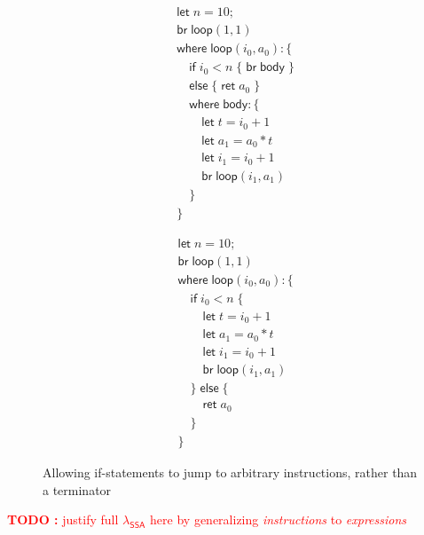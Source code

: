 \documentclass[acmsmall,screen,review]{acmart}
\newcounter{todos}
\newcommand{\TODO}[1]{{
  \stepcounter{todos}
  \begin{center}\large{\textcolor{red}{\textbf{TODO \arabic{todos}:} #1}}\end{center}
}}
\newcommand{\ms}[1]{\ensuremath{\mathsf{#1}}}
\newcommand{\isotopessa}{\(\lambda_{\ms{SSA}}\)}
\begin{document}
\begin{figure}
  \centering
  \begin{subfigure}[t]{.5\textwidth}
    \begin{align*}
      & \ms{let}\;n = 10; \\
      & \ms{br}\;\ms{loop}(1, 1) \\
      & \ms{where}\;\ms{loop}(i_0, a_0): \{ \\
      & \quad \ms{if}\;i_0 < n\;\{\;\ms{br}\;\ms{body}\;\} \\
      & \quad \ms{else}\;\{\;\ms{ret}\;a_0\;\} \\
      & \quad \ms{where}\;\ms{body}: \{\\ 
      & \qquad \ms{let}\;t = i_0 + 1 \\
      & \qquad \ms{let}\;a_1 = a_0 * t \\
      & \qquad \ms{let}\;i_1 = i_0 + 1 \\
      & \qquad \ms{br}\;\ms{loop}(i_1, a_1) \\
      & \quad \} \\
      & \}
    \end{align*}
  \end{subfigure}%
  \begin{subfigure}[t]{.5\textwidth}
    \begin{align*}
      & \ms{let}\;n = 10; \\
      & \ms{br}\;\ms{loop}(1, 1) \\
      & \ms{where}\;\ms{loop}(i_0, a_0): \{\\
      & \quad \ms{if}\;i_0 < n\;\{ \\
      & \qquad \ms{let}\;t = i_0 + 1 \\
      & \qquad \ms{let}\;a_1 = a_0 * t \\
      & \qquad \ms{let}\;i_1 = i_0 + 1 \\
      & \qquad \ms{br}\;\ms{loop}(i_1, a_1) \\
      & \quad \}\;\ms{else}\;\{ \\
      & \qquad \ms{ret}\;a_0 \\
      & \quad \} \\
      & \}
    \end{align*}
  \end{subfigure}
  \caption{Allowing if-statements to jump to arbitrary instructions, rather than a terminator}
  \Description{}
  \label{fig:bba-to-anf}
\end{figure}

\TODO{justify full \isotopessa{} here by generalizing \emph{instructions} to \emph{expressions}}
\end{document}
